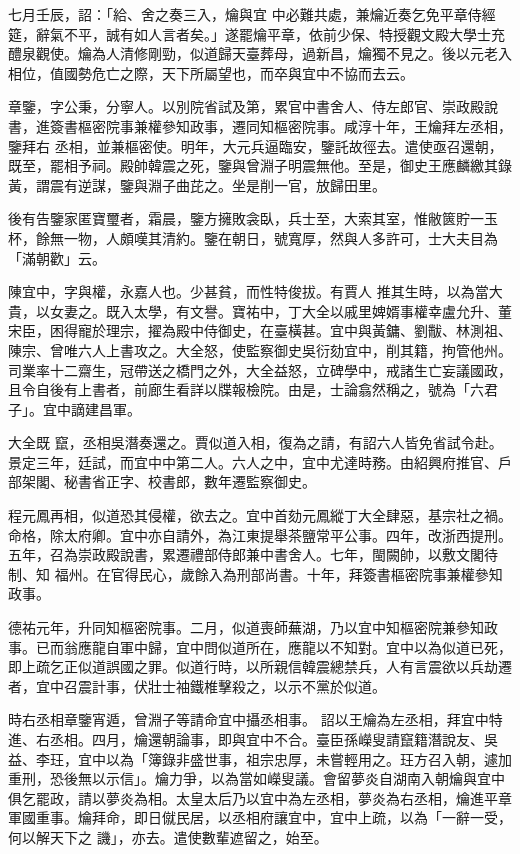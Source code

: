 \begin{pinyinscope}
 七月壬辰，詔：「給、舍之奏三入，爚與宜
 中必難共處，兼爚近奏乞免平章侍經筵，辭氣不平，誠有如人言者矣。」遂罷爚平章，依前少保、特授觀文殿大學士充醴泉觀使。爚為人清修剛勁，似道歸天臺葬母，過新昌，爚獨不見之。後以元老入相位，值國勢危亡之際，天下所屬望也，而卒與宜中不協而去云。



 章鑒，字公秉，分寧人。以別院省試及第，累官中書舍人、侍左郎官、崇政殿說書，進簽書樞密院事兼權參知政事，遷同知樞密院事。咸淳十年，王爚拜左丞相，鑒拜右
 丞相，並兼樞密使。明年，大元兵逼臨安，鑒託故徑去。遣使亟召還朝，既至，罷相予祠。殿帥韓震之死，鑒與曾淵子明震無他。至是，御史王應麟繳其錄黃，謂震有逆謀，鑒與淵子曲芘之。坐是削一官，放歸田里。



 後有告鑒家匿寶璽者，霜晨，鑒方擁敗衾臥，兵士至，大索其室，惟敝篋貯一玉杯，餘無一物，人頗嘆其清約。鑒在朝日，號寬厚，然與人多許可，士大夫目為「滿朝歡」云。



 陳宜中，字與權，永嘉人也。少甚貧，而性特俊拔。有賈人
 推其生時，以為當大貴，以女妻之。既入太學，有文譽。寶祐中，丁大全以戚里婢婿事權幸盧允升、董宋臣，困得寵於理宗，擢為殿中侍御史，在臺橫甚。宜中與黃鏞、劉黻、林測祖、陳宗、曾唯六人上書攻之。大全怒，使監察御史吳衍劾宜中，削其籍，拘管他州。司業率十二齋生，冠帶送之橋門之外，大全益怒，立碑學中，戒諸生亡妄議國政，且令自後有上書者，前廊生看詳以牒報檢院。由是，士論翕然稱之，號為「六君子」。宜中謫建昌軍。



 大全既
 竄，丞相吳潛奏還之。賈似道入相，復為之請，有詔六人皆免省試令赴。景定三年，廷試，而宜中中第二人。六人之中，宜中尤達時務。由紹興府推官、戶部架閣、秘書省正字、校書郎，數年遷監察御史。



 程元鳳再相，似道恐其侵權，欲去之。宜中首劾元鳳縱丁大全肆惡，基宗社之禍。命格，除太府卿。宜中亦自請外，為江東提舉茶鹽常平公事。四年，改浙西提刑。五年，召為崇政殿說書，累遷禮部侍郎兼中書舍人。七年，閩闕帥，以敷文閣待制、知
 福州。在官得民心，歲餘入為刑部尚書。十年，拜簽書樞密院事兼權參知政事。



 德祐元年，升同知樞密院事。二月，似道喪師蕪湖，乃以宜中知樞密院兼參知政事。已而翁應龍自軍中歸，宜中問似道所在，應龍以不知對。宜中以為似道已死，即上疏乞正似道誤國之罪。似道行時，以所親信韓震總禁兵，人有言震欲以兵劫遷者，宜中召震計事，伏壯士袖鐵椎擊殺之，以示不黨於似道。



 時右丞相章鑒宵遁，曾淵子等請命宜中攝丞相事。
 詔以王爚為左丞相，拜宜中特進、右丞相。四月，爚還朝論事，即與宜中不合。臺臣孫嶸叟請竄籍潛說友、吳益、李玨，宜中以為「簿錄非盛世事，祖宗忠厚，未嘗輕用之。玨方召入朝，遽加重刑，恐後無以示信」。爚力爭，以為當如嶸叟議。會留夢炎自湖南入朝爚與宜中俱乞罷政，請以夢炎為相。太皇太后乃以宜中為左丞相，夢炎為右丞相，爚進平章軍國重事。爚拜命，即日僦民居，以丞相府讓宜中，宜中上疏，以為「一辭一受，何以解天下之
 譏」，亦去。遣使數輩遮留之，始至。




\end{pinyinscope}
